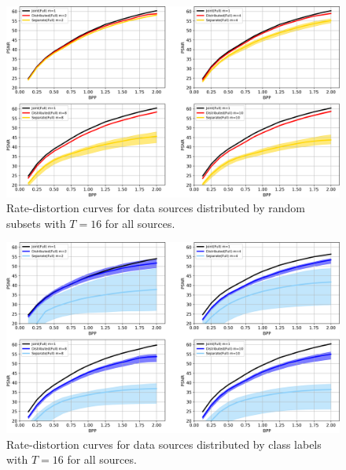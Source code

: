 \documentclass[10pt,twocolumn,letterpaper]{article}
\begin{document}
\begin{figure}
\begin{center}
\includegraphics[width=0.8\linewidth]{full_subset_band.png}
\end{center}
	\vspace{-0.2cm}
   \caption{Rate-distortion curves for data sources distributed by random subsets with $T=16$ for all sources.}
   \vspace{-0.2cm}
\label{fig_4}
\end{figure}

\begin{figure}
\begin{center}
\includegraphics[width=0.8\linewidth]{full_class_band.png}
\end{center}
	\vspace{-0.2cm}
   \caption{Rate-distortion curves for data sources distributed by class labels with $T=16$ for all sources.}
   \vspace{-0.2cm}
\label{fig_5}
\end{figure}
\end{document}
